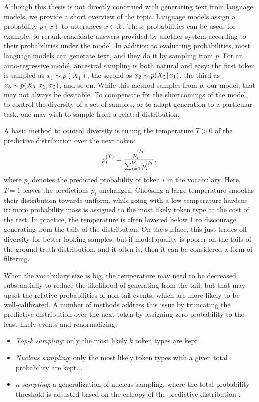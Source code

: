 \documentclass[12pt,a4paper,oneside]{book}
\newcommand{\tmid}{\hspace{0.08em}|\hspace{0.11em}}
\newcommand{\cX}{\mathcal{X}}
\begin{document}
Although this thesis is not directly concerned with generating text from language models, we provide a short overview of the topic.
Language models assign a probability $p(x)$ to utterances $x \in \cX$.
These probabilities can be used, for example, to rerank candidate answers provided by another system according to their probabilities under the model.
In addition to evaluating probabilities, most language models can generate text, and they do it by sampling from $p$.
For an auto-regressive model, ancestral sampling is both natural and easy: the first token is sampled as $x_1 \sim p(X_1)$, the second as $x_2 \sim p(X_2\tmid x_1)$, the third as $x_3 \sim p(X_3\tmid x_1,x_2)$, and so on.
While this method samples from $p$, our model, that may not always be desirable.
To compensate for the shortcomings of the model, to control the diversity of a set of samples, or to adapt generation to a particular task, one may wish to sample from a related distribution.

A basic method to control diversity is tuning the temperature $T > 0$ of the predictive distribution over the next token:
\begin{align*}
p^{(T)}_i = \frac{p_i^{\nicefrac{1}{T}}}{\sum^V_{i=1}p_i^{\nicefrac{1}{T}}},
\end{align*}
where $p_i$ denotes the predicted probability of token $i$ in the vocabulary.
Here, $T=1$ leaves the predictions $p_i$ unchanged.
Choosing a large temperature smooths their distribution towards uniform, while going with a low temperature hardens it: more probability mass is assigned to the most likely token type at the cost of the rest.
In practice, the temperature is often lowered below 1 to discourage generating from the tails of the distribution.
On the surface, this just trades off diversity for better looking samples, but if model quality is poorer on the tails of the ground truth distribution, and it often is, then it can be considered a form of filtering.

When the vocabulary size is big, the temperature may need to be decreased substantially to reduce the likelihood of generating from the tail, but that may upset the relative probabilities of non-tail events, which are more likely to be well-calibrated.
A number of methods address this issue by truncating the predictive distribution over the next token by assigning zero probability to the least likely events and renormalizing.
\begin{itemize}
\item \emph{Top-k sampling}: only the most likely $k$ token types are kept \citep{fan2018hierarchical}.
\item \emph{Nucleus sampling}: only the most likely token types with a given total probability are kept. \citep{holtzman2019curious}.
\item \emph{$\eta$-sampling}: a generalization of nucleus sampling, where the total probability threshold is adjusted based on the entropy of the predictive distribution \citep{hewitt2022truncation}.
\end{itemize}
\end{document}
